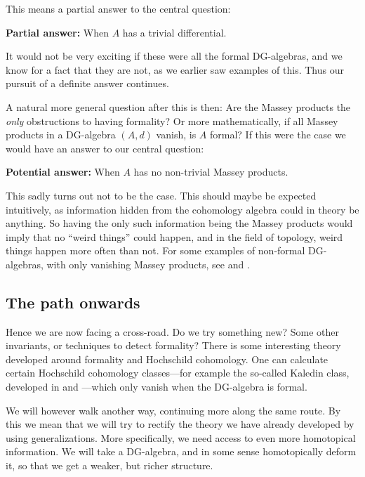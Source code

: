 This means a partial answer to the central question:

\textbf{Partial answer:} When $A$ has a trivial differential. 

It would not be very exciting if these were all the formal DG-algebras, and we know for a fact that they are not, as we earlier saw examples of this. Thus our pursuit of a definite answer continues. 

A natural more general question after this is then: Are the Massey products the \emph{only} obstructions to having formality? Or more mathematically, if all Massey products in a DG-algebra $(A,d)$ vanish, is $A$ formal? If this were the case we would have an answer to our central question:

\textbf{Potential answer:} When $A$ has no non-trivial Massey products.

This sadly turns out not to be the case. This should maybe be expected intuitively, as information hidden from the cohomology algebra could in theory be anything. So having the only such information being the Massey products would imply that no ``weird things'' could happen, and in the field of topology, weird things happen more often than not. For some examples of non-formal DG-algebras, with only vanishing Massey products, see \cite[Section 1.5]{non_formal1} and \cite[Example 8.13.]{non_formal2}. 

\subsection*{The path onwards}

Hence we are now facing a cross-road. Do we try something new? Some other invariants, or techniques to detect formality? There is some interesting theory developed around formality and Hochschild cohomology. One can calculate certain Hochschild cohomology classes---for example the so-called Kaledin class, developed in \cite{kaledin1} and \cite{kaledin2}---which only vanish when the DG-algebra is formal. 

We will however walk another way, continuing more along the same route. By this we mean that we will try to rectify the theory we have already developed by using generalizations. More specifically, we need access to even more homotopical information. We will take a DG-algebra, and in some sense homotopically deform it, so that we get a weaker, but richer structure. 





